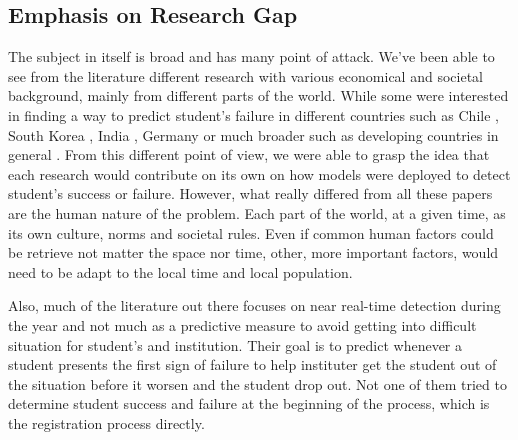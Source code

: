 \documentclass[../main.tex]{subfiles}
\begin{document}
\subsection{Emphasis on Research Gap}
The subject in itself is broad and has many point of attack. We've been able to see from the literature different research with various economical and societal background, mainly from different parts of the world.  
While some were interested in finding a way to predict student's failure in different countries such as Chile \cite{ramirez_prediction_2018, opazo_analysis_2021}, South Korea \cite{lee_machine_2019}, India \cite{mardolkar_forecasting_2020}, Germany \cite{berens_early_2018} or much broader such as developing countries in general \cite{mduma_survey_2019, mduma_machine_2019}. 
From this different point of view, we were able to grasp the idea that each research would contribute on its own on how models were deployed to detect student's success or failure. However, what really differed from all these papers are the human nature of the problem. Each part of the world, at a given time, as its own culture, norms and societal rules. Even if common human factors could be retrieve not matter the space nor time, other, more important factors, would need to be adapt to the local time and local population. 

Also, much of the literature out there focuses on near real-time detection during the year and not much as a predictive measure to avoid getting into difficult situation for student's and institution. Their goal is to predict whenever a student presents the first sign of failure to help instituter get the student out of the situation before it worsen and the student drop out.
Not one of them tried to determine student success and failure at the beginning of the process, which is the registration process directly.
\end{document}
